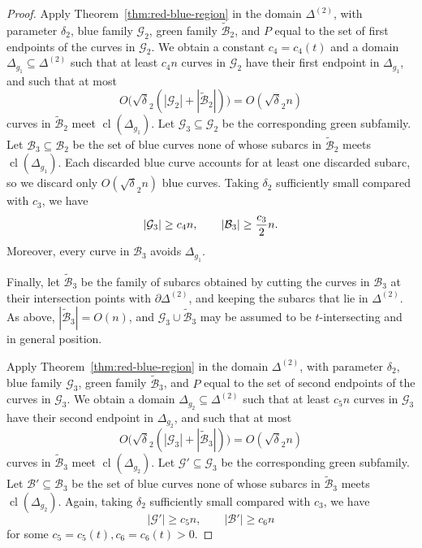 \documentclass[11pt]{article}
\theoremstyle{plain}
\theoremstyle{definition}
\theoremstyle{remark}
\begin{document}
\begin{proof}
Apply Theorem~\ref{thm:red-blue-region} in the domain
\(\Delta^{(2)}\), with parameter \(\delta_2\), blue family
\(\mathcal G_2\), green family \(\widetilde{\mathcal B}_2\), and \(P\)
equal to the set of first endpoints of the curves in \(\mathcal G_2\). We obtain a constant $c_4 = c_4(t)$ and a domain
\(\Delta_{g_1}\subseteq\Delta^{(2)}\) such that at least \(c_4n\) curves in
\(\mathcal G_2\) have their first endpoint in \(\Delta_{g_1}\), and such
that at most
\[
O\bigl(\sqrt\delta_2(|\mathcal G_2|+|\widetilde{\mathcal B}_2|)\bigr)
=O(\sqrt\delta_2 n)
\]
curves in \(\widetilde{\mathcal B}_2\) meet
\(\operatorname{cl}(\Delta_{g_1})\). Let \(\mathcal G_3\subseteq
\mathcal G_2\) be the corresponding green subfamily. Let
\(\mathcal B_3\subseteq\mathcal B_2\) be the set of blue curves none of whose
subarcs in \(\widetilde{\mathcal B}_2\) meets
\(\operatorname{cl}(\Delta_{g_1})\). Each discarded blue curve accounts for
at least one discarded subarc, so we discard only \(O(\sqrt\delta_2 n)\) blue
curves. Taking \(\delta_2\) sufficiently small compared with \(c_3\), we have
\[
|\mathcal G_3|\ge c_4n,\qquad |\mathcal B_3|\ge {c_3\over 2}n.
\]
Moreover, every curve in \(\mathcal B_3\) avoids \(\Delta_{g_1}\).

Finally, let \(\widetilde{\mathcal B}_3\) be the family of subarcs obtained
by cutting the curves in \(\mathcal B_3\) at their intersection points with
\(\partial\Delta^{(2)}\), and keeping the subarcs that lie in
\(\Delta^{(2)}\). As above, \(|\widetilde{\mathcal B}_3|=O(n)\), and
\(\mathcal G_3\cup\widetilde{\mathcal B}_3\) may be assumed to be
\(t\)-intersecting and in general position.

Apply Theorem~\ref{thm:red-blue-region} in the domain
\(\Delta^{(2)}\), with parameter \(\delta_2\), blue family
\(\mathcal G_3\), green family \(\widetilde{\mathcal B}_3\), and \(P\)
equal to the set of second endpoints of the curves in \(\mathcal G_3\). We obtain a domain
\(\Delta_{g_2}\subseteq\Delta^{(2)}\) such that at least \(c_5n\) curves in
\(\mathcal G_3\) have their second endpoint in \(\Delta_{g_2}\), and such
that at most
\[
O\bigl(\sqrt\delta_2(|\mathcal G_3|+|\widetilde{\mathcal B}_3|)\bigr)
=O(\sqrt\delta_2 n)
\]
curves in \(\widetilde{\mathcal B}_3\) meet
\(\operatorname{cl}(\Delta_{g_2})\). Let \(\mathcal G'\subseteq
\mathcal G_3\) be the corresponding green subfamily. Let
\(\mathcal B'\subseteq\mathcal B_3\) be the set of blue curves none of whose
subarcs in \(\widetilde{\mathcal B}_3\) meets
\(\operatorname{cl}(\Delta_{g_2})\). Again, taking \(\delta_2\) sufficiently small compared with \(c_3\), we have
\[
|\mathcal G'|\ge c_5n,\qquad |\mathcal B'|\ge c_6n
\]
for some \(c_5 = c_5(t), c_6=c_6(t)>0\).


\end{proof}
\end{document}
